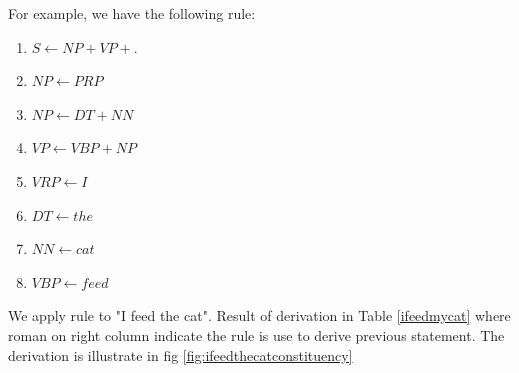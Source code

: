 For example, we have the following rule:
\begin{enumerate}[label=(\roman*)]
	\item $S \leftarrow NP + VP + .$
	\item $NP \leftarrow PRP $
	\item $NP \leftarrow DT + NN$
	\item $VP \leftarrow VBP + NP$
	\item $VRP \leftarrow I$
	\item $DT \leftarrow the$
	\item $NN \leftarrow cat$
	\item $VBP \leftarrow feed$
\end{enumerate}
We apply rule to "I feed the cat". Result of derivation in Table \ref{ifeedmycat}  where roman on right column indicate the rule is use to derive previous statement. The derivation is illustrate in fig \ref{fig:ifeedthecatconstituency}


